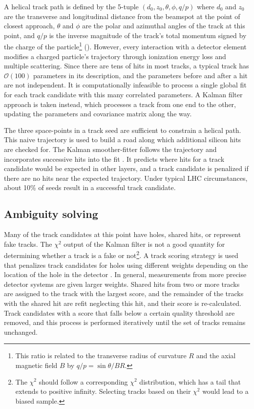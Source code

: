 A helical track path is defined by the 5-tuple
\( \left( d_0, z_0, \theta, \phi, q/p \right) \)
where $d_0$ and $z_0$ are the transverse and longitudinal distance from the beamspot at the point of closest approach, $\theta$ and $\phi$ are the polar and azimuthal angles of the track at this point, and $q/p$ is the inverse magnitude of the track's total momentum signed by the charge of the particle\footnote{This ratio is related to the transverse radius of curvature $R$ and the axial magnetic field $B$ by $q/p = \sin \theta / B R$.} ().
However, every interaction with a detector element modifies a charged particle's trajectory through ionization energy loss and multiple scattering.
Since there are tens of hits in most tracks, a typical track has $\mathcal{O}(100)$ parameters in its description, and the parameters before and after a hit are not independent.
It is computationally infeasible to process a single global fit for each track candidate with this many correlated parameters.
A Kalman filter approach is taken instead, which processes a track from one end to the other, updating the parameters and covariance matrix along the way.

The three space-points in a track seed are sufficient to constrain a helical path.
This naive trajectory is used to build a road along which additional silicon hits are checked for.
The Kalman smoother-fitter follows the trajectory and incorporates successive hits into the fit \cite{Cornelissen:2008zza}. %
It predicts where hits for a track candidate would be expected in other layers, and a track candidate is penalized if there are no hits near the expected trajectory. 
Under typical LHC circumstances, about 10\% of seeds result in a successful track candidate.

\subsection{Ambiguity solving} %

Many of the track candidates at this point have holes, shared hits, or represent fake tracks.
The $\chi^2$ output of the Kalman filter is not a good quantity for determining whether a track is a fake or not\footnote{The $\chi^2$ should follow a corresponding $\chi^2$ distribution, which has a tail that extends to positive infinity. Selecting tracks based on their $\chi^2$ would lead to a biased sample.}.
A track scoring strategy is used that penalizes track candidates for holes using different weights depending on the location of the hole in the detector \cite{Wicke:1998efw}.
In general, measurements from more precise detector systems are given larger weights.
Shared hits from two or more tracks are assigned to the track with the largest score, and the remainder of the tracks with the shared hit are refit neglecting this hit, and their score is re-calculated.
Track candidates with a score that falls below a certain quality threshold are removed, and this process is performed iteratively until the set of tracks remains unchanged.

